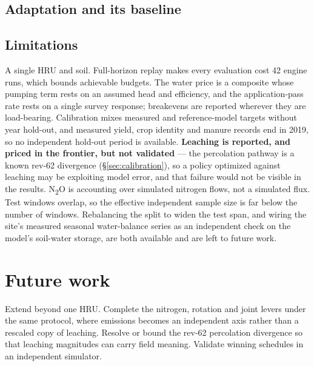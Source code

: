 \documentclass[a4paper,fleqn]{cas-sc}
\begin{document}
\subsection{Adaptation and its baseline}\label{sec:adaptation}


\subsection{Limitations}\label{sec:limitations}

A single HRU and soil. Full-horizon replay makes every evaluation cost 42 engine runs,
which bounds achievable budgets. The water price is a composite whose pumping term rests on an assumed head and efficiency, and the application-pass rate rests on a single survey response; breakevens are
reported wherever they are load-bearing. Calibration mixes measured and reference-model
targets without year hold-out, and measured yield, crop identity and manure records end
in 2019, so no independent hold-out period is available. \textbf{Leaching is reported,
and priced in the frontier, but not validated} --- the percolation pathway is a known
rev-62 divergence (\S\ref{sec:calibration}), so a policy optimized against leaching may
be exploiting model error, and that failure would not be visible in the results.
N\textsubscript{2}O is accounting over simulated nitrogen flows, not a simulated flux.
Test windows overlap, so the effective independent sample size is far below the number of
windows. Rebalancing the split to widen the test span, and wiring the site's measured
seasonal water-balance series as an independent check on the model's soil-water storage,
are both available and are left to future work.

\section{Future work}\label{sec:future}

Extend beyond one HRU. Complete the nitrogen, rotation
and joint levers under the same protocol, where emissions becomes an independent axis
rather than a rescaled copy of leaching. Resolve or bound the rev-62 percolation
divergence so that leaching magnitudes can carry field meaning. Validate winning
schedules in an independent simulator.
\end{document}
